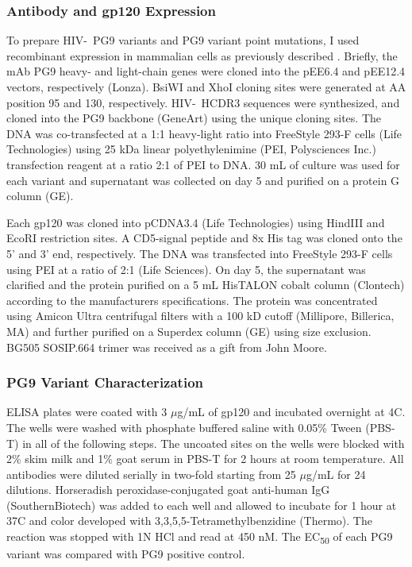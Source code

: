 \subsubsection{Antibody and gp120 Expression}
To prepare HIV-\naive~PG9 variants and PG9 variant point mutations, I used recombinant expression in mammalian cells as previously described \citep{Xu:2010da}. Briefly, the mAb PG9 heavy- and light-chain genes were cloned into the pEE6.4 and pEE12.4 vectors, respectively (Lonza). BsiWI and XhoI cloning sites were generated at AA position 95 and 130, respectively. HIV-\naive~HCDR3 sequences were synthesized, and cloned into the PG9 backbone (GeneArt) using the unique cloning sites. The DNA was co-transfected at a 1:1 heavy-light ratio into FreeStyle 293-F cells (Life Technologies) using 25 kDa linear polyethylenimine (PEI, Polysciences Inc.) transfection reagent at a ratio 2:1 of PEI to DNA. 30 mL of culture was used for each variant and supernatant was collected on day 5 and purified on a protein G column (GE).

Each gp120 was cloned into pCDNA3.4 (Life Technologies) using HindIII and EcoRI restriction sites. A CD5-signal peptide and 8x His tag was cloned onto the 5' and 3' end, respectively. The DNA was transfected into FreeStyle 293-F cells using PEI at a ratio of 2:1 (Life Sciences). On day 5, the supernatant was clarified and the protein purified on a 5 mL HisTALON cobalt column (Clontech) according to the manufacturers specifications. The protein was concentrated using Amicon Ultra centrifugal filters with a 100 kD cutoff (Millipore, Billerica, MA) and further purified on a Superdex column (GE) using size exclusion. BG505 SOSIP.664 trimer was received as a gift from John Moore.

\subsubsection{PG9 Variant Characterization}
ELISA plates were coated with 3 $\mu$g/mL of gp120 and incubated overnight at 4\degree C. The wells were washed with phosphate buffered saline with 0.05\% Tween (PBS-T) in all of the following steps. The uncoated sites on the wells were blocked with 2\% skim milk and 1\% goat serum in PBS-T for 2 hours at room temperature.  All antibodies were diluted serially in two-fold starting from 25 $\mu$g/mL for 24 dilutions. Horseradish peroxidase-conjugated goat anti-human IgG (SouthernBiotech) was added to each well and allowed to incubate for 1 hour at 37\degree C and color developed with 3,3,5,5-Tetramethylbenzidine (Thermo). The reaction was stopped with 1N HCl and read at 450 nM. The EC\textsubscript{50} of each PG9 variant was compared with PG9 positive control.

